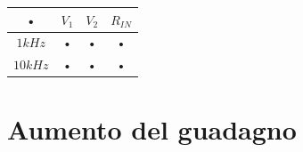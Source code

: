 \documentclass[10pt,a4paper]{article}
\begin{document}
\begin{tabular}{|c|c|c|c|}
\hline 
• & $V_1$ & $V_2$ & $R_{IN}$ \\ 
\hline 
$1 kHz$ & • & • & • \\ 
\hline 
$10 kHz$ & • & • & • \\ 
\hline 
\end{tabular} 

\section{Aumento del guadagno}
\end{document}
